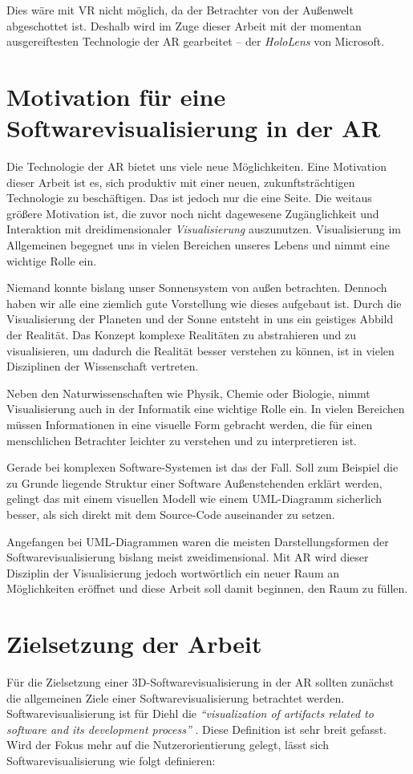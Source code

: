 Dies wäre mit VR nicht möglich, da der Betrachter von der Außenwelt abgeschottet ist. Deshalb wird im Zuge dieser Arbeit mit der momentan ausgereiftesten Technologie der AR gearbeitet -- der \emph{HoloLens} von Microsoft.

\section{Motivation für eine Softwarevisualisierung in der AR}
Die Technologie der AR bietet uns viele neue Möglichkeiten. Eine Motivation dieser Arbeit ist es, sich produktiv mit einer neuen, zukunftsträchtigen Technologie zu beschäftigen. Das ist jedoch nur die eine Seite. Die weitaus größere Motivation ist, die zuvor noch nicht dagewesene Zugänglichkeit und Interaktion mit dreidimensionaler \emph{Visualisierung} auszunutzen. Visualisierung im Allgemeinen begegnet uns in vielen Bereichen unseres Lebens und nimmt eine wichtige Rolle ein.

Niemand konnte bislang unser Sonnensystem von außen betrachten. Dennoch haben wir alle eine ziemlich gute Vorstellung wie dieses aufgebaut ist. Durch die Visualisierung der Planeten und der Sonne entsteht in uns ein geistiges Abbild der Realität. Das Konzept komplexe Realitäten zu abstrahieren und zu visualisieren, um dadurch die Realität besser verstehen zu können, ist in vielen Disziplinen der Wissenschaft vertreten.

Neben den Naturwissenschaften wie Physik, Chemie oder Biologie, nimmt Visualisierung auch in der Informatik eine wichtige Rolle ein. In vielen Bereichen müssen Informationen in eine visuelle Form gebracht werden, die für einen menschlichen Betrachter leichter zu verstehen und zu interpretieren ist.

Gerade bei komplexen Software-Systemen ist das der Fall. Soll zum Beispiel die zu Grunde liegende Struktur einer Software Außenstehenden erklärt werden, gelingt das mit einem visuellen Modell wie einem UML-Diagramm sicherlich besser, als sich direkt mit dem Source-Code auseinander zu setzen.

Angefangen bei UML-Diagrammen waren die meisten Darstellungsformen der Softwarevisualisierung bislang meist zweidimensional. Mit AR wird dieser Disziplin der Visualisierung jedoch wortwörtlich ein neuer Raum an Möglichkeiten eröffnet und diese Arbeit soll damit beginnen, den Raum zu füllen.

\section{Zielsetzung der Arbeit}
Für die Zielsetzung einer 3D-Softwarevisualisierung in der AR sollten zunächst die allgemeinen Ziele einer Softwarevisualisierung betrachtet werden. Softwarevisualisierung ist für Diehl die \textit{"`visualization of artifacts related to software and its development process"'} \cite{diehl2007software}. Diese Definition ist sehr breit gefasst. Wird der Fokus mehr auf die Nutzerorientierung gelegt, lässt sich Softwarevisualisierung wie folgt definieren:

